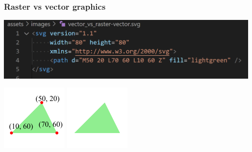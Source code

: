 \begin{frame}
    \frametitle{Raster vs vector graphics}

    \centering

    \includegraphics[width=\textwidth]{assets/vector_vs_raster-vector_code.png}

    \quad
    \includegraphics[height=0.4\textheight]{assets/vector_vs_raster-vector-annotated.pdf}%
    \quad
    \includegraphics[height=0.4\textheight]{assets/vector_vs_raster-vector.pdf}

\end{frame}

